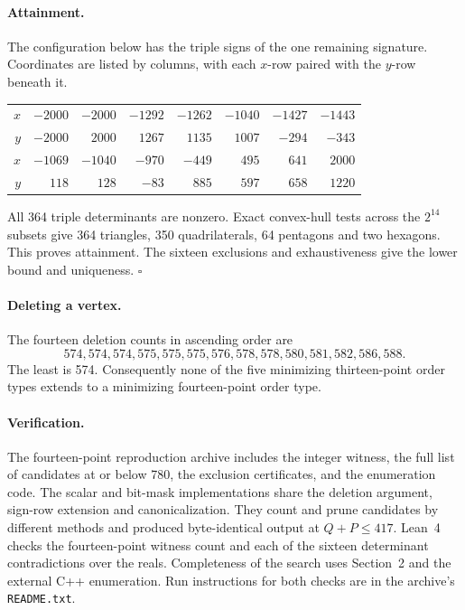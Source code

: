 \documentclass[11pt]{article}
\begin{document}
\paragraph{Attainment.} The configuration below has the triple signs of the one remaining signature. Coordinates are listed by columns, with each $x$-row paired with the $y$-row beneath it.
\begin{center}
\begin{tabular}{r|rrrrrrr}
$x$ & $-2000$ & $-2000$ & $-1292$ & $-1262$ & $-1040$ & $-1427$ & $-1443$\\
$y$ & $-2000$ & $2000$ & $1267$ & $1135$ & $1007$ & $-294$ & $-343$\\[3pt]
$x$ & $-1069$ & $-1040$ & $-970$ & $-449$ & $495$ & $641$ & $2000$\\
$y$ & $118$ & $128$ & $-83$ & $885$ & $597$ & $658$ & $1220$
\end{tabular}
\end{center}
All 364 triple determinants are nonzero. Exact convex-hull tests across the $2^{14}$ subsets give 364 triangles, 350 quadrilaterals, 64 pentagons and two hexagons. This proves attainment. The sixteen exclusions and exhaustiveness give the lower bound and uniqueness. \hfill$\square$

\paragraph{Deleting a vertex.} The fourteen deletion counts in ascending order are
\[
574,574,574,575,575,575,576,578,578,580,581,582,586,588.
\]
The least is 574. Consequently none of the five minimizing thirteen-point order types extends to a minimizing fourteen-point order type.

\paragraph{Verification.} The fourteen-point reproduction archive includes the integer witness, the full list of candidates at or below 780, the exclusion certificates, and the enumeration code. The scalar and bit-mask implementations share the deletion argument, sign-row extension and canonicalization. They count and prune candidates by different methods and produced byte-identical output at $Q+P\le417$. Lean~4 checks the fourteen-point witness count and each of the sixteen determinant contradictions over the reals. Completeness of the search uses Section~2 and the external C++ enumeration. Run instructions for both checks are in the archive's \texttt{README.txt}.
\end{document}
